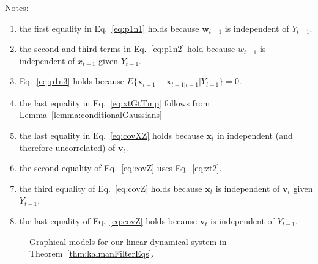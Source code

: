 \documentclass[12pt]{article}
\begin{document}
Notes:
\begin{enumerate}
    \item the first equality in Eq.~\ref{eq:p1n1} holds because
        $\mathbf{w}_{t-1}$ is independent of $Y_{t-1}$.
    \item the second and third terms in Eq.~\ref{eq:p1n2} hold because
        $w_{t-1}$ is independent of $x_{t-1}$ given $Y_{t-1}$.
    \item Eq.~\ref{eq:p1n3} holds because
        $E\{\mathbf{x}_{t-1}-\mathbf{x}_{t-1|t-1}|Y_{t-1}\}=0$.
    \item the last equality in Eq.~\ref{eq:xtGtTmp} follows from
        Lemma~\ref{lemma:conditionalGaussians}
    \item the last equality in Eq.~\ref{eq:covXZ} holds because $\mathbf{x}_t$
        in independent (and therefore uncorrelated) of $\mathbf{v}_t$.
    \item the second equality of Eq.~\ref{eq:covZ} uses Eq.~\ref{eq:zt2}.
    \item the third equality of Eq.~\ref{eq:covZ} holds because $\mathbf{x}_t$
        is independent of $\mathbf{v}_t$ given $Y_{t-1}$.
    \item the last equality of Eq.~\ref{eq:covZ} holds because $\mathbf{v}_t$
        is independent of $Y_{t-1}$.

\end{enumerate}

\begin{figure}
    \centering
    
    \caption{Graphical models for our linear dynamical system in
    Theorem~\ref{thm:kalmanFilterEqs}.}
    \label{fig:ldsModel}
\end{figure}





\end{document}
